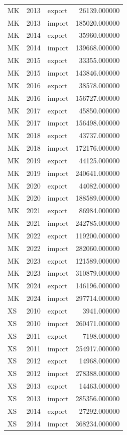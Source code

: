 \begin{tabular}{lrlr}
MK & 2013 & export & 26139.000000 \\
MK & 2013 & import & 185020.000000 \\
MK & 2014 & export & 35960.000000 \\
MK & 2014 & import & 139668.000000 \\
MK & 2015 & export & 33355.000000 \\
MK & 2015 & import & 143846.000000 \\
MK & 2016 & export & 38578.000000 \\
MK & 2016 & import & 156727.000000 \\
MK & 2017 & export & 45850.000000 \\
MK & 2017 & import & 156498.000000 \\
MK & 2018 & export & 43737.000000 \\
MK & 2018 & import & 172176.000000 \\
MK & 2019 & export & 44125.000000 \\
MK & 2019 & import & 240641.000000 \\
MK & 2020 & export & 44082.000000 \\
MK & 2020 & import & 188589.000000 \\
MK & 2021 & export & 86984.000000 \\
MK & 2021 & import & 242785.000000 \\
MK & 2022 & export & 119200.000000 \\
MK & 2022 & import & 282060.000000 \\
MK & 2023 & export & 121589.000000 \\
MK & 2023 & import & 310879.000000 \\
MK & 2024 & export & 146196.000000 \\
MK & 2024 & import & 297714.000000 \\
XS & 2010 & export & 3941.000000 \\
XS & 2010 & import & 260471.000000 \\
XS & 2011 & export & 7198.000000 \\
XS & 2011 & import & 254917.000000 \\
XS & 2012 & export & 14968.000000 \\
XS & 2012 & import & 278388.000000 \\
XS & 2013 & export & 14463.000000 \\
XS & 2013 & import & 285356.000000 \\
XS & 2014 & export & 27292.000000 \\
XS & 2014 & import & 368234.000000 \\

\end{tabular}
